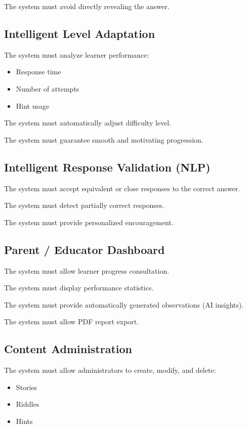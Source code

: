 \documentclass[12pt,a4paper]{article}
\begin{document}
The system must avoid directly revealing the answer.

\subsection{Intelligent Level Adaptation}

The system must analyze learner performance:
\begin{itemize}
    \item Response time
    \item Number of attempts
    \item Hint usage
\end{itemize}

The system must automatically adjust difficulty level.

The system must guarantee smooth and motivating progression.

\subsection{Intelligent Response Validation (NLP)}

The system must accept equivalent or close responses to the correct answer.

The system must detect partially correct responses.

The system must provide personalized encouragement.

\subsection{Parent / Educator Dashboard}

The system must allow learner progress consultation.

The system must display performance statistics.

The system must provide automatically generated observations (AI insights).

The system must allow PDF report export.

\subsection{Content Administration}

The system must allow administrators to create, modify, and delete:
\begin{itemize}
    \item Stories
    \item Riddles
    \item Hints
\end{itemize}
\end{document}
